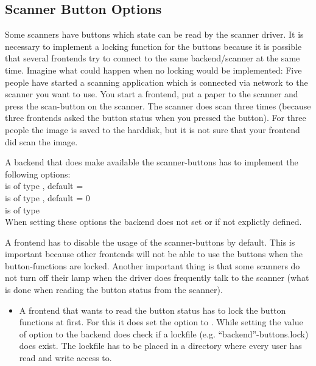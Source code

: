 \documentclass[11pt,DVIps]{report}
\begin{document}
\begin{changebar}
\subsection{Scanner Button Options}
Some scanners have buttons which state can be read by the scanner driver. 
It is necessary to implement a locking function for the buttons
because it is possible that several frontends try to connect to the
same backend/scanner at the same time. Imagine what could happen
when no locking would be implemented:
Five people have started a scanning application which is connected
via network to the scanner you want to use. You start a frontend,
put a paper to the scanner and press the scan-button on the scanner.
The scanner does scan three times (because three frontends asked the
button status when you pressed the button). For three people the
image is saved to the harddisk, but it is not sure that your
frontend did scan the image.

A backend that does make available the scanner-buttons has to
implement the following options:\\
 is of type , default = \\
 is of type , default = 0\\
 is of type \\
When setting these options the backend does not set 
or  if not explictly defined.

A frontend has to disable the usage of the scanner-buttons by default. This is important
because other frontends will not be able to use the buttons when the button-functions are locked.
Another important thing is that some scanners do not turn off their lamp when the driver
does frequently talk to the scanner (what is done when reading the button status from the scanner).

\begin{itemize}

\item
A frontend that wants to read the button status has to lock the
button functions at first. For this it does set the option
 to .
While setting the value of option  to 
the backend does check if a lockfile (e.g. ``backend''-buttons.lock) does exist.
The lockfile has to be placed in a directory where every user has read and write access to.


\end{itemize}
\end{changebar}
\end{document}
